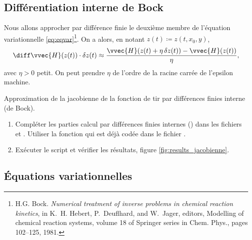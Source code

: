 \subsection{Diff\'erentiation interne de Bock}

Nous allons approcher par diff\'erence finie le deuxi\`eme membre de l'\'equation variationnelle \eqref{eq:eqvar}\footnote{%
H.G. Bock. \emph{Numerical treatment of inverse problems in chemical reaction kinetics}, in K.~H. Hebert, P.~Deuflhard, and W.~Jager, editors,
Modelling of chemical reaction systems, volume 18 of Springer series in Chem. Phys., pages 102--125, 1981.}.
On a alors, en notant $z(t) \coloneqq z(t,x_0,y)$,
\[
    \diff \vvec{H}(z(t)) \cdot \delta z(t) \approx \frac{\vvec{H}(z(t) + \eta\, \delta z(t)) - \vvec{H}(z(t))}{\eta},
\]
avec $\eta > 0$ petit. On peut prendre $\eta$ de l'ordre de la racine carr\'ee de l'epsilon machine.
\begin{myExercice} Approximation de la jacobienne de la fonction de tir par diff\'erences finies interne (de Bock).
    \begin{enumerate}
        \item Compl\'eter les parties calcul par diff\'erences finies internes () dans les fichiers  et .
            Utiliser la fonction  qui est d\'ej\`a cod\'ee dans le fichier .
        \item Ex\'ecuter le script  et v\'erifier les r\'esultats, \cf figure \ref{fig:results_jacobienne}.
    \end{enumerate}
\end{myExercice}

\subsection{\'Equations variationnelles}

